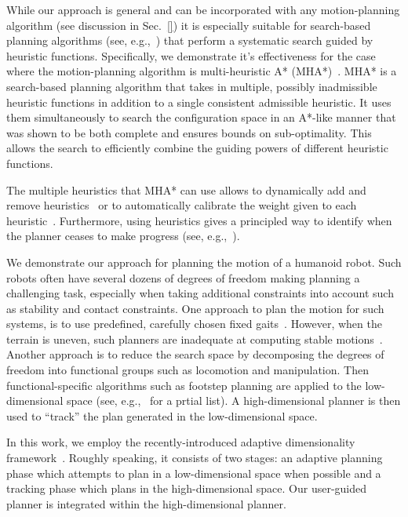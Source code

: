 \documentclass[conference]{IEEEtran}
\begin{document}
%

While our approach is general and can be incorporated with any motion-planning algorithm (see discussion in Sec.~\ref{}) it is especially suitable for search-based planning algorithms (see, e.g.,~\cite{CCL14}) that perform a systematic search guided by heuristic functions.
Specifically, we demonstrate it's effectiveness for the case where the motion-planning algorithm is multi-heuristic A* (MHA*)~\cite{ASNHL16, NAL15}.
MHA* is a search-based planning algorithm that takes in multiple, possibly inadmissible heuristic functions in addition to a single consistent admissible heuristic.
It uses them simultaneously to search the configuration space in an A*-like manner that was shown to be both complete and ensures bounds on sub-optimality. 
This allows the search to efficiently combine the guiding powers of different heuristic functions. 

The multiple heuristics that MHA* can use allows to dynamically add and remove heuristics~\cite{INL15} or to automatically calibrate the weight given to each heuristic~\cite{PNAL15}.
Furthermore, using heuristics gives a principled way to identify when the planner ceases to make progress (see, e.g.,~\cite{VNL17}).

We demonstrate our approach for planning the motion of a humanoid robot. Such robots often have several dozens of degrees of freedom making planning a challenging task, especially when taking additional constraints into account such as stability and contact constraints.
One approach to plan the motion for such systems, is to use predefined, carefully chosen fixed gaits~\cite{KKKHKHAI04}. 
However, when the terrain is uneven, such planners are inadequate at computing stable motions~\cite{HBLHW08}.
Another approach is to reduce the search space by decomposing the degrees of freedom into functional groups such as locomotion and manipulation.
Then functional-specific algorithms such as footstep planning are applied to the low-dimensional space (see, e.g.,~\cite{CLCKHK05, KNKII01, PSBLY12, XCXZC09, KKNII02} for a prtial list).
A high-dimensional planner is then used to ``track'' the plan generated in the low-dimensional space.

In this work, we employ the recently-introduced adaptive dimensionality framework~\cite{GCBSL11, GSL12, GSL13}.
Roughly speaking,  it consists of two stages: an adaptive planning phase which attempts to plan in a low-dimensional space when possible and a tracking phase which plans in the high-dimensional space.
Our user-guided planner is integrated within the high-dimensional planner.
\end{document}

